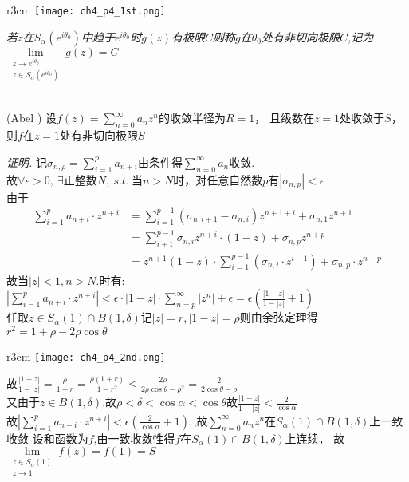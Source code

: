 \begin{wrapfigure}[2]{r}{3cm}
    \centering
    \texttt{[image: ch4\_p4\_1st.png]}
\end{wrapfigure}
\noindent \emph{若$z$在$S_\alpha(e^{i\theta_0})$中趋于$e^{i\theta_0}$时$g(z)$有极限$C$则称$g$在$\theta_0$处有非切向极限$C$,记为
$\displaystyle{\lim\limits_{\substack{z\to e^{i\theta_0}\\z\in S_\alpha(e^{i\theta_0})}}g(z)=C}$}
\\
\\
\begin{mypro}[*](\rm Abel \uppercase\expandafter{})
    设$\displaystyle{f(z)=\sum\limits_{n=0}^\infty a_nz^n}$的收敛半径为$R=1$，
    且级数在$z=1$处收敛于$S$，则$f$在$z=1$处有非切向极限$S$
\end{mypro}
\noindent\emph{证明.}
记$\displaystyle{\sigma_{n,\rho}=\sum\limits_{i=1}^p a_{n+i}}$由条件得$\displaystyle{\sum\limits_{n=0}^\infty a_n}$收敛.\\
故$\forall\epsilon>0 ,\ \exists$正整数$N,\  s.t.\ $当$n>N$时，对任意自然数$p$有$|\sigma_{n,p}|<\epsilon$\\
由于
\begin{align*}
    \sum\limits_{i=1}^pa_{n+i}\cdot z^{n+i}&=\sum\limits_{i=1}^{p-1}(\sigma_{n,i+1}-\sigma_{n,i})z^{n+1+i}+\sigma_{n,1}z^{n+1}\\
    &=\sum\limits_{i+1}^{p-1}\sigma_{n,i}z^{n+i}\cdot(1-z)+\sigma_{n,p}z^{n+p}\\
    &=z^{n+1}(1-z)\cdot\sum\limits_{i=1}^{p-1}(\sigma_{n,i}\cdot z^{i-1})+\sigma_{n,p}\cdot z^{n+p}
\end{align*}
故当$|z|<1,n>N$.时有:$\displaystyle{\left|\sum\limits_{i=1}^pa_{n+i}\cdot z^{n+i}\right|
<\epsilon\cdot|1-z|\cdot\sum\limits_{n=p}^\infty|z^n|+\epsilon=\epsilon\left(\frac{|1-z|}{1-|z|}+1\right)}$\\
任取$\displaystyle{z\in S_\alpha(1)\cap B(1,\delta)}$记$|z|=r,|1-z|=\rho$则由余弦定理得$r^2=1+\rho-2\rho\cos\theta$\\
\begin{wrapfigure}[3]{r}{3cm}
    \centering
    \texttt{[image: ch4\_p4\_2nd.png]}
\end{wrapfigure}
故$\displaystyle{\frac{|1-z|}{1-|z|}=\frac{\rho}{1-r}=\frac{\rho(1+r)}{1-r^2}
\leq\frac{2\rho}{2\rho\cos\theta-\rho^2}=\frac{2}{2\cos\theta-\rho}}$\\
又由于$z\in B(1,\delta).$故$\rho<\delta<\cos\alpha<\cos\theta$故$\displaystyle{\frac{|1-z|}{1-|z|}<\frac{2}{\cos\alpha}}$\\
故$\displaystyle{\left|\sum\limits_{i=1}^pa_{n+i}\cdot z^{n+i}\right|<\epsilon(\frac{2}{\cos\alpha}+1)}$
,故$\displaystyle{\sum\limits_{n=0}^\infty a_nz^n}$在$\displaystyle{S_\alpha(1)\cap B(1,\delta)}$上一致收敛
设和函数为$f$,由一致收敛性得$f$在$\displaystyle{S_\alpha(1)\cap B(1,\delta)}$上连续，
故$\displaystyle{\lim\limits_{\substack{z\in S_\alpha(1)\\z\to 1}}f(z)=f(1)=S}$\\\rightline{$\square$}
